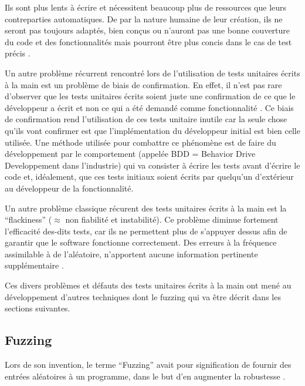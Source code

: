 \documentclass[a4paper]{report}
\begin{document}
Ils sont plus lents à écrire et nécessitent beaucoup plus de ressources que leurs contreparties automatiques.
De par la nature humaine de leur création, ils ne seront pas toujours adaptés, bien conçus ou n'auront pas une bonne couverture du code et des fonctionnalités mais pourront être plus concis dans le cas de test précis \cite{Zhu1997}.

Un autre problème récurrent rencontré lors de l'utilisation de tests unitaires écrits à la main est un problème de biais de confirmation.
En effet, il n'est pas rare d'observer que les tests unitaires écrits soient juste une confirmation de ce que le développeur a écrit et non ce qui a été demandé comme fonctionnalité \cite{Calikli2014}.
Ce biais de confirmation rend l'utilisation de ces tests unitaire inutile car la seule chose qu'ils vont confirmer est que l'implémentation du développeur initial est bien celle utilisée.
Une méthode utilisée pour combattre ce phénomène est de faire du développement par le comportement (appelée BDD = Behavior Drive Developpement dans l'industrie) qui va consister à écrire les tests avant d'écrire le code et, idéalement, que ces tests initiaux soient écrits par quelqu'un d'extérieur au développeur de la fonctionnalité.

Un autre problème classique récurent des tests unitaires écrits à la main est la “flackiness” ($\approx$ non fiabilité et instabilité).
Ce problème diminue fortement l'efficacité des-dits tests, car ils ne permettent plus de s'appuyer dessus afin de garantir que le software fonctionne correctement.
Des erreurs à la fréquence assimilable à de l'aléatoire, n'apportent aucune information pertinente supplémentaire \cite{Luo2014}.


Ces divers problèmes et défauts des tests unitaires écrits à la main ont mené au développement d’autres techniques dont le fuzzing qui va être décrit dans les sections suivantes.

\subsection{Fuzzing}

Lors de son invention, le terme “Fuzzing” avait pour signification de fournir des entrées aléatoires à un programme, dans le but d'en augmenter la robustesse \cite{Forrester2000}.
\end{document}
